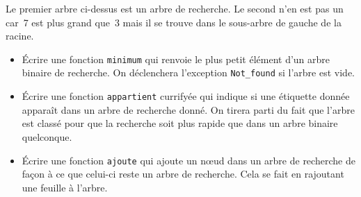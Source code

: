 \documentclass[11pt, a4paper]{article}
\newcommand{\bitem}{\item[$\bullet$]}
\begin{document}
Le premier arbre ci-dessus est un arbre de recherche. Le second n'en
est pas un car~7 est plus grand que~3 mais il se trouve dans le
sous-arbre de gauche de la racine.

\begin{itemize}

  \bitem Écrire une fonction \texttt{minimum} qui renvoie le plus
  petit élément d'un arbre binaire de recherche. On déclenchera
  l'exception \texttt{Not\_found} si l'arbre est vide.

  \bitem Écrire une fonction \texttt{appartient} currifyée qui indique
  si une étiquette donnée apparaît dans un arbre de recherche
  donné. On tirera parti du fait que l'arbre est classé pour que la
  recherche soit plus rapide que dans un arbre binaire quelconque.

  \bitem Écrire une fonction \texttt{ajoute} qui ajoute un n{\oe}ud
  dans un arbre de recherche de façon à ce que celui-ci reste un arbre
  de recherche. Cela se fait en rajoutant une feuille à l'arbre.

\end{itemize}
\end{document}
